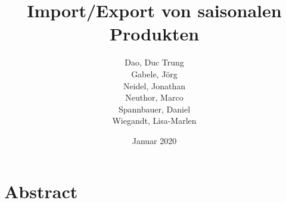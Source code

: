 \documentclass{article}
\title{Import/Export von saisonalen Produkten}
\author{
  Dao, Duc Trung\\
  Gabele, Jörg\\
  Neidel, Jonathan\\
  Neuthor, Marco\\
  Spannbauer, Daniel\\
  Wiegandt, Lisa-Marlen
}
\date{Januar 2020}
\begin{document}
\maketitle

\vfill
\section*{Abstract}


\break
\tableofcontents
\break


\break
\printbibliography
\end{document}
